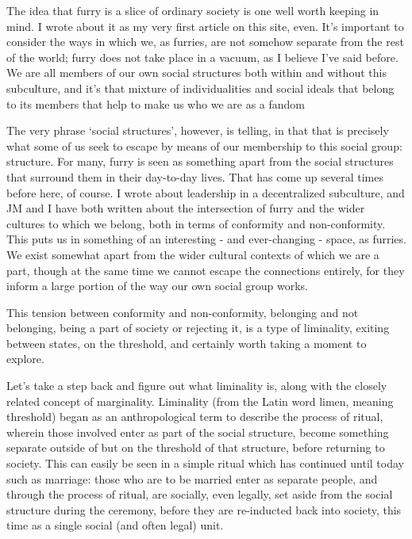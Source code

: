 
The idea that furry is a slice of ordinary society is one well worth keeping in mind. I wrote about it as my very first article on this site, even. It's important to consider the ways in which we, as furries, are not somehow separate from the rest of the world; furry does not take place in a vacuum, as I believe I've said before. We are all members of our own social structures both within and without this subculture, and it's that mixture of individualities and social ideals that belong to its members that help to make us who we are as a fandom

The very phrase `social structures', however, is telling, in that that is precisely what some of us seek to escape by means of our membership to this social group: structure. For many, furry is seen as something apart from the social structures that surround them in their day-to-day lives. That has come up several times before here, of course. I wrote about leadership in a decentralized subculture, and JM and I have both written about the intersection of furry and the wider cultures to which we belong, both in terms of conformity and non-conformity. This puts us in something of an interesting - and ever-changing - space, as furries. We exist somewhat apart from the wider cultural contexts of which we are a part, though at the same time we cannot escape the connections entirely, for they inform a large portion of the way our own social group works.

This tension between conformity and non-conformity, belonging and not belonging, being a part of society or rejecting it, is a type of liminality, exiting between states, on the threshold, and certainly worth taking a moment to explore.

Let's take a step back and figure out what liminality is, along with the closely related concept of marginality. Liminality (from the Latin word limen, meaning threshold) began as an anthropological term to describe the process of ritual, wherein those involved enter as part of the social structure, become something separate outside of but on the threshold of that structure, before returning to society. This can easily be seen in a simple ritual which has continued until today such as marriage: those who are to be married enter as separate people, and through the process of ritual, are socially, even legally, set aside from the social structure during the ceremony, before they are re-inducted back into society, this time as a single social (and often legal) unit.

